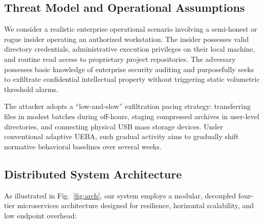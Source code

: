 \documentclass[conference]{IEEEtran}
\begin{document}
\subsection{Threat Model and Operational Assumptions}
We consider a realistic enterprise operational scenario involving a semi-honest or rogue insider operating an authorized workstation. The insider possesses valid directory credentials, administrative execution privileges on their local machine, and routine read access to proprietary project repositories. The adversary possesses basic knowledge of enterprise security auditing and purposefully seeks to exfiltrate confidential intellectual property without triggering static volumetric threshold alarms. 

The attacker adopts a ``low-and-slow'' exfiltration pacing strategy: transferring files in modest batches during off-hours, staging compressed archives in user-level directories, and connecting physical USB mass storage devices. Under conventional adaptive UEBA, such gradual activity aims to gradually shift normative behavioral baselines over several weeks.

\subsection{Distributed System Architecture}
As illustrated in Fig.~\ref{fig:arch}, our system employs a modular, decoupled four-tier microservices architecture designed for resilience, horizontal scalability, and low endpoint overhead:
\end{document}
